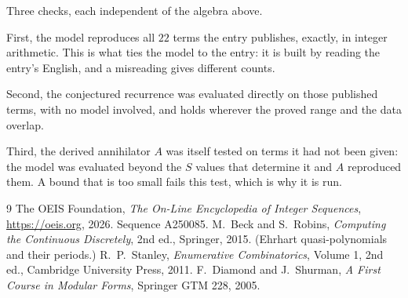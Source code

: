 \documentclass[11pt,a4paper]{article}
\theoremstyle{plain}
\theoremstyle{definition}
\begin{document}
Three checks, each independent of the algebra above.

First, the model reproduces all $22$ terms the entry publishes, exactly, in integer
arithmetic. This is what ties the model to the entry: it is built by reading the entry's
English, and a misreading gives different counts.

Second, the conjectured recurrence was evaluated directly on those published terms, with no
model involved, and holds wherever the proved range and the data overlap.

Third, the derived annihilator $A$ was itself tested on terms it had not been given: the model
was evaluated beyond the $S$ values that determine it and $A$ reproduced them. A bound that is
too small fails this test, which is why it is run.

\begin{thebibliography}{9}
 The OEIS Foundation, \emph{The On-Line Encyclopedia of Integer
Sequences}, \url{https://oeis.org}, 2026. Sequence A250085.
 M.~Beck and S.~Robins, \emph{Computing the Continuous Discretely},
2nd ed., Springer, 2015. (Ehrhart quasi-polynomials and their periods.)
 R.~P.~Stanley, \emph{Enumerative Combinatorics}, Volume 1, 2nd ed.,
Cambridge University Press, 2011.
 F.~Diamond and J.~Shurman, \emph{A First Course in Modular Forms},
Springer GTM 228, 2005.
\end{thebibliography}
\end{document}
